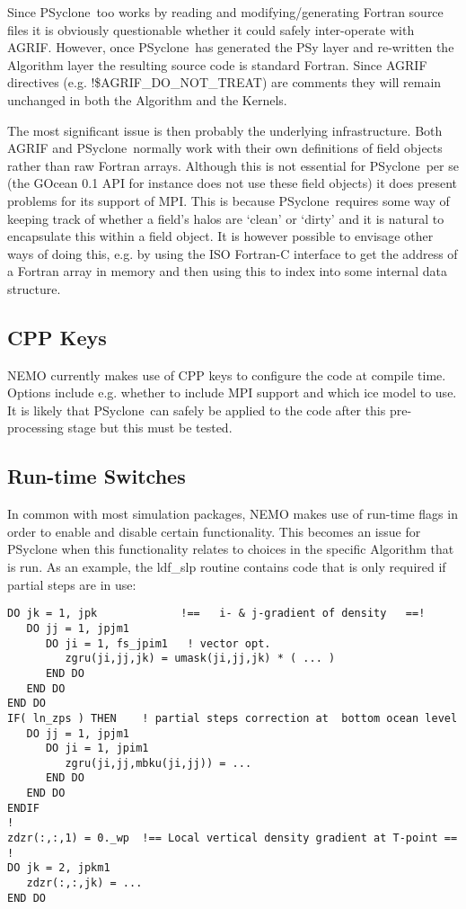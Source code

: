 \documentclass{article}
\newcommand{\psyclone}{{PS}yclone}
\begin{document}
Since \psyclone\ too works by reading and modifying/generating Fortran
source files it is obviously questionable whether it could safely
inter-operate with AGRIF. However, once \psyclone\ has generated the PSy
layer and re-written the Algorithm layer the resulting source code is
standard Fortran. Since AGRIF directives
(e.g. !\$AGRIF\_DO\_NOT\_TREAT) are comments they will remain unchanged
in both the Algorithm and the Kernels.

The most significant issue is then probably the underlying
infrastructure.  Both AGRIF and \psyclone\ normally work with their own
definitions of field objects rather than raw Fortran arrays. Although
this is not essential for \psyclone\ per se (the GOcean 0.1 API for
instance does not use these field objects) it does present problems
for its support of MPI. This is because \psyclone\ requires some way of
keeping track of whether a field's halos are `clean' or `dirty' and it
is natural to encapsulate this within a field object. It is however
possible to envisage other ways of doing this, e.g. by using the ISO
Fortran-C interface to get the address of a Fortran array in memory
and then using this to index into some internal data structure.

\subsection{CPP Keys}

NEMO currently makes use of CPP keys to configure the code at compile
time. Options include e.g. whether to include MPI support and which
ice model to use. It is likely that \psyclone\ can safely be applied to
the code after this pre-processing stage but this must be tested.

\subsection{Run-time Switches}

In common with most simulation packages, NEMO makes use of run-time
flags in order to enable and disable certain functionality. This
becomes an issue for PSyclone when this functionality relates to
choices in the specific Algorithm that is run. As an example, the
ldf\_slp routine contains code that is only required if partial steps
are in use:

\begin{verbatim}
DO jk = 1, jpk             !==   i- & j-gradient of density   ==!
   DO jj = 1, jpjm1
      DO ji = 1, fs_jpim1   ! vector opt.
         zgru(ji,jj,jk) = umask(ji,jj,jk) * ( ... )
      END DO
   END DO
END DO
IF( ln_zps ) THEN    ! partial steps correction at  bottom ocean level
   DO jj = 1, jpjm1
      DO ji = 1, jpim1
         zgru(ji,jj,mbku(ji,jj)) = ...
      END DO
   END DO
ENDIF
!
zdzr(:,:,1) = 0._wp  !== Local vertical density gradient at T-point == !
DO jk = 2, jpkm1
   zdzr(:,:,jk) = ...
END DO
\end{verbatim}
\end{document}
